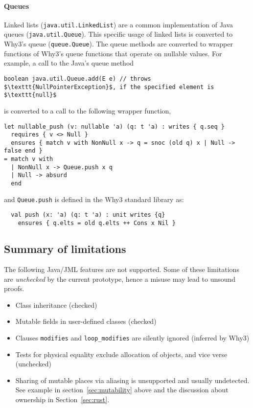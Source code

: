 \documentclass[a4paper]{report}
\begin{document}
\paragraph{Queues}
Linked lists (\texttt{java.util.LinkedList}) are a common implementation of Java
queues (\texttt{java.util.Queue}). This specific usage of linked lists is
converted to Why3's queue (\texttt{queue.Queue}). The queue methods are
converted to wrapper functions of Why3's queue functions that operate on
nullable values. For example, a call to the Java's queue method
\begin{lstlisting}
boolean java.util.Queue.add(E e) // throws $\texttt{NullPointerException}$, if the specified element is $\texttt{null}$
\end{lstlisting}
is converted to a call to the following wrapper function,
\begin{lstlisting}
let nullable_push (v: nullable 'a) (q: t 'a) : writes { q.seq }
  requires { v <> Null }
  ensures { match v with NonNull x -> q = snoc (old q) x | Null -> false end }
= match v with
  | NonNull x -> Queue.push x q
  | Null -> absurd
  end
\end{lstlisting}
and \lstinline{Queue.push} is defined in the Why3 standard library as:
\begin{lstlisting}
  val push (x: 'a) (q: t 'a) : unit writes {q}
    ensures { q.elts = old q.elts ++ Cons x Nil }
\end{lstlisting}

\subsection{Summary of limitations}

The following Java/JML features are not supported. Some of these limitations are
\emph{unchecked} by the current prototype, hence a misuse may lead to unsound
proofs.
\begin{itemize}
\item Class inheritance (checked)
\item Mutable fields in user-defined classes (checked)
\item Clauses \lstinline{modifies} and \lstinline{loop_modifies} are silently
  ignored (inferred by Why3)
\item Tests for physical equality exclude allocation of objects, and vice verse (unchecked)
\item Sharing of mutable places via aliasing is unsupported and
  usually undetected. See example in section~\ref{sec:mutability}
  above and the discussion about ownership in Section~\ref{sec:rust}.
\end{itemize}
\end{document}
